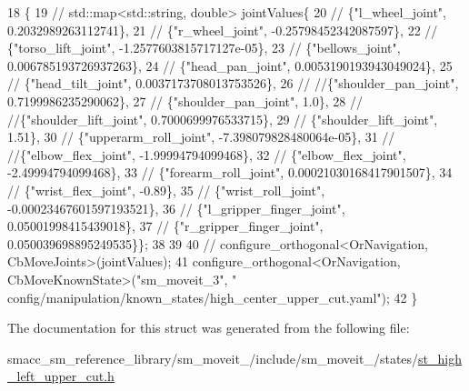 \begin{DoxyCode}
18     \{
19         \textcolor{comment}{// std::map<std::string, double> jointValues\{}
20         \textcolor{comment}{//     \{"l\_wheel\_joint", 0.2032989263112741\},}
21         \textcolor{comment}{//     \{"r\_wheel\_joint", -0.25798452342087597\},}
22         \textcolor{comment}{//     \{"torso\_lift\_joint", -1.2577603815717127e-05\},}
23         \textcolor{comment}{//     \{"bellows\_joint", 0.006785193726937263\},}
24         \textcolor{comment}{//     \{"head\_pan\_joint", 0.0053190193943049024\},}
25         \textcolor{comment}{//     \{"head\_tilt\_joint", 0.0037173708013753526\},}
26         \textcolor{comment}{//     //\{"shoulder\_pan\_joint", 0.7199986235290062\},}
27         \textcolor{comment}{//     \{"shoulder\_pan\_joint", 1.0\},}
28         \textcolor{comment}{//     //\{"shoulder\_lift\_joint", 0.7000699976533715\},}
29         \textcolor{comment}{//     \{"shoulder\_lift\_joint", 1.51\},}
30         \textcolor{comment}{//     \{"upperarm\_roll\_joint", -7.398079828480064e-05\},}
31         \textcolor{comment}{//     //\{"elbow\_flex\_joint", -1.99994794099468\},}
32         \textcolor{comment}{//     \{"elbow\_flex\_joint", -2.49994794099468\},}
33         \textcolor{comment}{//     \{"forearm\_roll\_joint", 0.00021030168417901507\},}
34         \textcolor{comment}{//     \{"wrist\_flex\_joint", -0.89\},}
35         \textcolor{comment}{//     \{"wrist\_roll\_joint", -0.00023467601597193521\},}
36         \textcolor{comment}{//     \{"l\_gripper\_finger\_joint", 0.05001998415439018\},}
37         \textcolor{comment}{//     \{"r\_gripper\_finger\_joint", 0.050039698895249535\}\};}
38 
39 
40 \textcolor{comment}{//        configure\_orthogonal<OrNavigation, CbMoveJoints>(jointValues);}
41         configure\_orthogonal<OrNavigation, CbMoveKnownState>(\textcolor{stringliteral}{"sm\_moveit\_3"}, \textcolor{stringliteral}{"
      config/manipulation/known\_states/high\_center\_upper\_cut.yaml"});
42     \}
\end{DoxyCode}


The documentation for this struct was generated from the following file\+:\begin{DoxyCompactItemize}
\item 
smacc\+\_\+sm\+\_\+reference\+\_\+library/sm\+\_\+moveit\+\_/include/sm\+\_\+moveit\+\_/states/\hyperlink{st__high__left__upper__cut_8h}{st\+\_\+high\+\_\+left\+\_\+upper\+\_\+cut.\+h}\end{DoxyCompactItemize}
